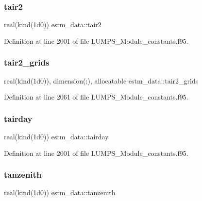 \subsubsection{\texorpdfstring{tair2}{tair2}}
{\footnotesize\ttfamily real(kind(1d0)) estm\+\_\+data\+::tair2}



Definition at line 2001 of file L\+U\+M\+P\+S\+\_\+\+Module\+\_\+constants.\+f95.

\mbox{\label{namespaceestm__data_a748eeedc041c2a83b7242c1d000c349d}} 
\subsubsection{\texorpdfstring{tair2\+\_\+grids}{tair2\_grids}}
{\footnotesize\ttfamily real(kind(1d0)), dimension(\+:), allocatable estm\+\_\+data\+::tair2\+\_\+grids}



Definition at line 2061 of file L\+U\+M\+P\+S\+\_\+\+Module\+\_\+constants.\+f95.

\mbox{\label{namespaceestm__data_a7c4bbc32ea4b8646912a7418623e1522}} 
\subsubsection{\texorpdfstring{tairday}{tairday}}
{\footnotesize\ttfamily real(kind(1d0)) estm\+\_\+data\+::tairday}



Definition at line 2001 of file L\+U\+M\+P\+S\+\_\+\+Module\+\_\+constants.\+f95.

\mbox{\label{namespaceestm__data_a6f163e79efdc616eef7a91dee109f9a0}} 
\subsubsection{\texorpdfstring{tanzenith}{tanzenith}}
{\footnotesize\ttfamily real(kind(1d0)) estm\+\_\+data\+::tanzenith}



